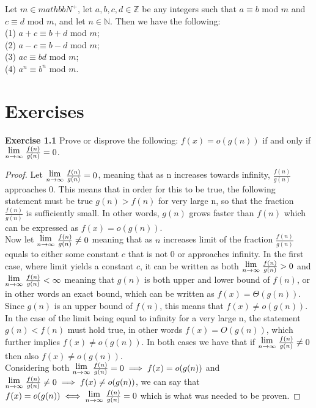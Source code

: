 \documentclass[a4paper]{article}
\newcommand{\Lim}[1]{\raisebox{0.5ex}{{$\displaystyle \lim_{#1}\;$}}}
\begin{document}
\begin{theorem}
Let $m \in mathbb{N}^{+}$, let $a, b, c, d \in \mathbb{Z}$ be any integers such that $a \equiv b$ mod $m$ and $c \equiv d$ mod $m$, and let $n \in \mathbb{N}$. Then we have the following:\\
(1) $a + c \equiv b + d$ mod $m$;\\
(2) $a - c \equiv b - d$ mod $m$;\\
(3) $ac \equiv bd$ mod $m$;\\
(4) $a^{n} \equiv b^{n}$ mod $m$.
\end{theorem}



\section{Exercises}
\noindent \textbf{Exercise 1.1} Prove or disprove the following: $f(x) = o(g(n))$ if and only if $\Lim{n \to \infty} \frac{f(n)}{g(n)}=0$.
\begin{proof}
Let $\Lim{n \to \infty} \frac{f(n)}{g(n)}=0$, meaning that as n increases towards infinity, $\frac{f(n)}{g(n)}$ approaches $0$. This means that in order for this to be true, the following statement must be true $g(n) > f(n)$ for very large n, so that the fraction $\frac{f(n)}{g(n)}$ is sufficiently small. In other words, $g(n)$ grows faster than $f(n)$ which can be expressed as $f(x) = o(g(n))$. \\
  
Now let $\Lim{n \to \infty} \frac{f(n)}{g(n)}\neq0$ meaning that as $n$ increases limit of the fraction $\frac{f(n)}{g(n)}$ equals to either some constant $c$ that is not $0$ or approaches infinity. In the first case, where limit yields a constant $c$, it can be written as both $\Lim{n \to \infty} \frac{f(n)}{g(n)}>0$ and $\Lim{n \to \infty} \frac{f(n)}{g(n)}<\infty$ meaning that $g(n)$ is both upper and lower bound of $f(n)$, or in other words an exact bound, which can be written as $f(x) = \Theta(g(n))$. Since $g(n)$ is an upper bound of $f(n)$, this means that $f(x) \neq o(g(n))$. In the case of the limit being equal to infinity for a very large n, the statement $g(n) < f(n)$ must hold true, in other words $f(x) = O(g(n))$, which further implies $f(x) \neq o(g(n))$. In both cases we have that if $\Lim{n \to \infty} \frac{f(n)}{g(n)}\neq0$ then also $f(x) \neq o(g(n))$. \\
  
Considering both $\Lim{n \to \infty} \frac{f(n)}{g(n)}=0 \implies f(x) = o(g(n))$ and $\Lim{n \to \infty} \frac{f(n)}{g(n)}\neq0 \implies f(x) \neq o(g(n))$, we can say that $f(x) = o(g(n)) \iff \Lim{n \to \infty} \frac{f(n)}{g(n)}=0$ which is what was needed to be proven.

\end{proof}
\end{document}
